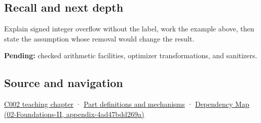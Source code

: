 \subsection{Recall and next depth}\label{appendix-1a599c924a4e-recall-and-next-depth}

Explain signed integer overflow without the label, work the example above, then state the assumption whose removal would change the result.

\textbf{Pending:} checked arithmetic facilities, optimizer transformations, and sanitizers.

\subsection{Source and navigation}\label{appendix-1a599c924a4e-source-and-navigation}

\hyperref[01-foundations-i-ch001-arithmetic-becomes-a-policy]{C002 teaching chapter} · \hyperref[appendix-fd090d982a15]{Part definitions and mechanisms} · \href{../02-Foundations-II/main.pdf\#nameddest=appendix-4ad47bdd269a}{Dependency Map (02-Foundations-II, appendix-4ad47bdd269a)}
